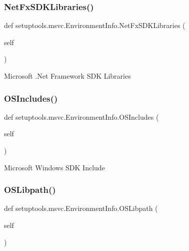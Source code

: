 \subsubsection{\texorpdfstring{Net\+Fx\+S\+D\+K\+Libraries()}{NetFxSDKLibraries()}}
{\footnotesize\ttfamily def setuptools.\+msvc.\+Environment\+Info.\+Net\+Fx\+S\+D\+K\+Libraries (\begin{DoxyParamCaption}\item[{}]{self }\end{DoxyParamCaption})}

\begin{DoxyVerb}Microsoft .Net Framework SDK Libraries
\end{DoxyVerb}
 \mbox{\label{classsetuptools_1_1msvc_1_1_environment_info_a5dd42b70389abbceecb4675fa4669cd7}} 
\subsubsection{\texorpdfstring{O\+S\+Includes()}{OSIncludes()}}
{\footnotesize\ttfamily def setuptools.\+msvc.\+Environment\+Info.\+O\+S\+Includes (\begin{DoxyParamCaption}\item[{}]{self }\end{DoxyParamCaption})}

\begin{DoxyVerb}Microsoft Windows SDK Include
\end{DoxyVerb}
 \mbox{\label{classsetuptools_1_1msvc_1_1_environment_info_ac0bfd6c2e533ac3db2b4fb30feb97349}} 
\subsubsection{\texorpdfstring{O\+S\+Libpath()}{OSLibpath()}}
{\footnotesize\ttfamily def setuptools.\+msvc.\+Environment\+Info.\+O\+S\+Libpath (\begin{DoxyParamCaption}\item[{}]{self }\end{DoxyParamCaption})}

